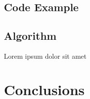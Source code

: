 \documentclass[12pt, a4paper]{article} %
\begin{document}
\subsection{Code Example}


 

\newpage
\subsection{Algorithm}



\begin{algorithm}
\caption{Lorem ipsum dolor sit amet}
\begin{algorithmic}



\end{algorithmic}
\end{algorithm}


\section{Conclusions}






\newpage

\end{document}
